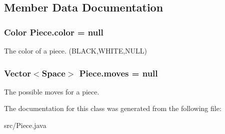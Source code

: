 \subsection{Member Data Documentation}
\hypertarget{class_piece_ac3be06c38af4366f18cef94594a30a0d}{
\subsubsection[{color}]{\setlength{\rightskip}{0pt plus 5cm}Color Piece.\-color = null\hspace{0.3cm}{\ttfamily [protected]}}}\label{class_piece_ac3be06c38af4366f18cef94594a30a0d}
The color of a piece. (B\-L\-A\-C\-K,W\-H\-I\-T\-E,N\-U\-L\-L) \hypertarget{class_piece_a6fb158d95f588f706ae716b13487ba10}{
\subsubsection[{moves}]{\setlength{\rightskip}{0pt plus 5cm}Vector$<${\bf Space}$>$ Piece.\-moves = null\hspace{0.3cm}{\ttfamily [protected]}}}\label{class_piece_a6fb158d95f588f706ae716b13487ba10}
The possible moves for a piece. 

The documentation for this class was generated from the following file\-:\begin{DoxyCompactItemize}
\item 
src/Piece.\-java\end{DoxyCompactItemize}
